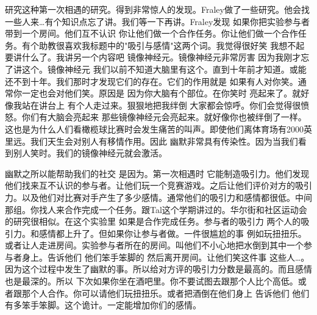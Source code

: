 研究这种第一次相遇的研究。得到非常惊人的发现。Fraley做了一些研究。他会找一些人来…有个知识点忘了讲。我们等一下再讲。Fraley发现 如果你把实验参与者带到一个房间。他们互不认识 你让他们做一个合作任务。你让他们做一个合作任务。有个助教很喜欢我标题中的"吸引与感情"这两个词。我觉得很好笑 我想不起要讲什么了。我讲另一个内容吧 镜像神经元。镜像神经元非常厉害 因为我刚才忘了讲这个。镜像神经元 我们以前不知道大脑里有这个。直到十年前才知道。或能还不到十年。我们那时才发现它们的存在。它们的作用就是 如果有人对你笑。通常你一定也会对他们笑。原因是 因为你大脑有个部位。在你笑时 亮起来了。就好像我站在讲台上 有个人走过来。狠狠地把我绊倒 大家都会惊呼。你们会觉得很愤怒。你们有大脑会亮起来 那些镜像神经元会亮起来。就好像你也被绊倒了一样。这也是为什么人们看橄榄球比赛时会发生痛苦的叫声。即使他们离体育场有2000英里远。我们天生会对别人有移情作用。因此 幽默非常具有传染性。因为当我们看到别人笑时。我们的镜像神经元就会激活。 

幽默之所以能帮助我们的社交 是因为。第一次相遇时 它能制造吸引力。他们发现 他们找来互不认识的参与者。让他们玩一个竞赛游戏。之后让他们评价对方的吸引力。以及他们对比赛对手产生了多少感情。通常他们的吸引力和感情都很低。中间那组。你找人来合作完成一个任务。跟Tal这个学期讲过的。华尔街和社区运动会的研究很相似。在这个实验里 如果是合作完成任务。参与者的吸引力 两个人的吸引力。和感情都上升了。但如果你让参与者做。一件很尴尬的事 例如玩扭扭乐。或者让人走进房间。实验参与者所在的房间。叫他们不小心地把水倒到其中一个参与者身上。告诉他们 他们笨手笨脚的 然后离开房间。让他们笑这件事 这些人…。因为这个过程中发生了幽默的事。所以给对方评的吸引力分数是最高的。而且感情也是最深的。所以 下次如果你坐在酒吧里。你不要试图去跟那个人比个高低。或者跟那个人合作。你可以请他们玩扭扭乐。或者把酒倒在他们身上 告诉他们 他们有多笨手笨脚。这个诡计。一定能增加你们的感情。 

